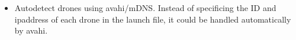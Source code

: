 \begin{itemize}
	\item Autodetect drones using avahi/mDNS. Instead of specificing the ID and ipaddress of each drone in the launch file, it could be handled automatically by avahi.
\end{itemize}
